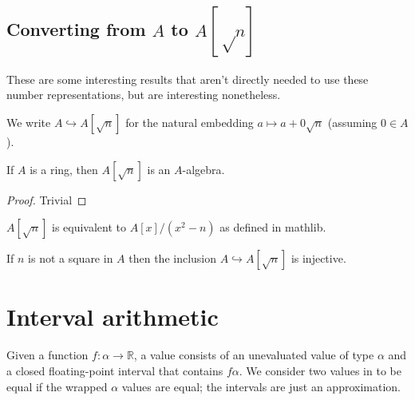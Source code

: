 \subsection{Converting from $A$ to $A[√n]$}

These are some interesting results that aren't directly needed to use these
number representations, but are interesting nonetheless.


\begin{definition}
  \label{def:adjoinOfA}
  \leanok
  We write $A \hookrightarrow A[\sqrt{n}]$ for the natural embedding
  $a \mapsto a + 0\sqrt{n}$ (assuming $0 ∈ A$).
\end{definition}


\begin{lemma}
  \label{thm:adjoinAlgebra}
  \leanok
  If $A$ is a ring, then $A[\sqrt{n}]$ is an $A$-algebra.
\end{lemma}

\begin{proof}
  Trivial
  \leanok
\end{proof}

\begin{lemma}
  \label{thm:mathlibAdjoin}
  $A[\sqrt{n}]$ is equivalent to $A[x] / (x^2 - n)$ as defined in mathlib.
\end{lemma}


\begin{lemma}
  \label{thm:adjoinInjective}
  If $n$ is not a square in $A$ then the inclusion $A \hookrightarrow
  A[\sqrt{n}]$ is injective.
\end{lemma}

\section{Interval arithmetic}

\begin{definition}
  \label{def:filtered}
  \leanok
  Given a function $f : α → ℝ$, a  value consists of
  an unevaluated value of type $α$ and a closed floating-point interval that
  contains $f α$. We consider two values in  to be
  equal if the wrapped $α$ values are equal; the intervals are just an
  approximation.
\end{definition}

